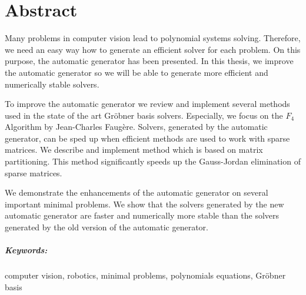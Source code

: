 \chapter*{Abstract}
Many problems in computer vision lead to polynomial systems solving. Therefore, we need an easy way how to generate an efficient solver for each problem. On this purpose, the automatic generator has been presented. In this thesis, we improve the automatic generator so we will be able to generate more efficient and numerically stable solvers.

To improve the automatic generator we review and implement several methods used in the state of the art Gr\"obner basis solvers. Especially, we focus on the $F_4$ Algorithm by Jean-Charles Faug\`ere. Solvers, generated by the automatic generator, can be sped up when efficient methods are used to work with sparse matrices. We describe and implement method which is based on matrix partitioning. This method significantly speeds up the Gauss-Jordan elimination of sparse matrices.

We demonstrate the enhancements of the automatic generator on several important minimal problems. We show that the solvers generated by the new automatic generator are faster and numerically more stable than the solvers generated by the old version of the automatic generator.

\paragraph{Keywords:} computer vision, robotics, minimal problems, polynomials equations, Gr\"ob\-ner basis

